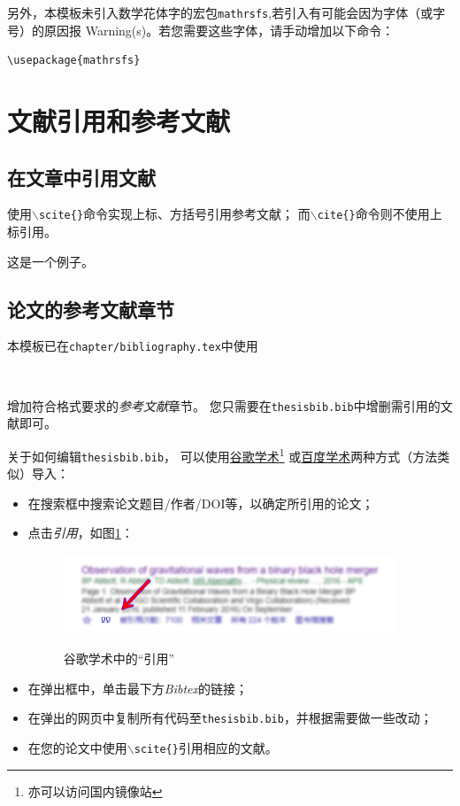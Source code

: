     另外，本模板未引入数学花体字的宏包\texttt{mathrsfs},若引入有可能会因为字体（或字号）的原因报 Warning(s)。若您需要这些字体，请手动增加以下命令：
	\begin{lstlisting}
\usepackage{mathrsfs}
	\end{lstlisting}


\section{文献引用和参考文献}\label{sec:bib}
    \subsection{在文章中引用文献}
        使用\texttt{$\backslash$scite\{\}}命令实现上标、方括号引用参考文献；
        而\texttt{$\backslash$cite\{\}}命令则不使用上标引用。

        这是一个例子。
	\subsection{论文的参考文献章节}
		本模板已在\texttt{chapter/bibliography.tex}中使用
	\begin{lstlisting}[firstnumber=3]


	\end{lstlisting}
    增加符合格式要求的\emph{参考文献}章节。
    您只需要在\texttt{thesisbib.bib}中增删需引用的文献即可。
    
    关于如何编辑\texttt{thesisbib.bib}，
    可以使用\href{http://scholar.google.com.cn/}{谷歌学术}\footnote{亦可以访问国内镜像站}
    或\href{http://xueshu.baidu.com}{百度学术}两种方式（方法类似）导入\BibTeX{}：
    \begin{itemize}
        \item 在搜索框中搜索论文题目/作者/DOI等，以确定所引用的论文；
        \item 点击\emph{引用}，如图\ref{fig:addbib}：
            \begin{figure}[H]
                \centering 
                \caption{谷歌学术中的``引用''}
                \includegraphics[width=10cm]{figure/AddBib.png}
                \label{fig:addbib}
            \end{figure}
        \item 在弹出框中，单击最下方\emph{Bibtex}的链接；
        \item 在弹出的网页中复制所有代码至\texttt{thesisbib.bib}，并根据需要做一些改动；
        \item 在您的论文中使用\texttt{$\backslash$scite\{\}}引用相应的文献。
    \end{itemize}

